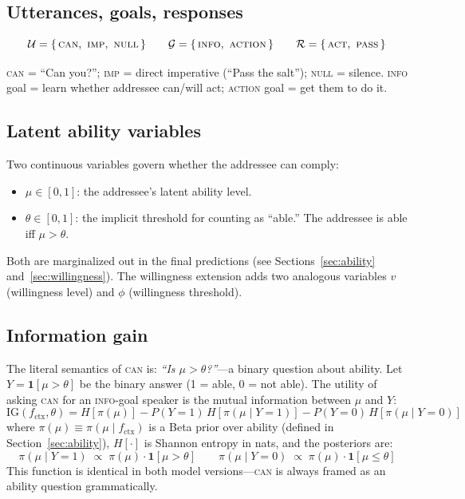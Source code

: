 \documentclass[11pt]{article}
\begin{document}
\subsection{Utterances, goals, responses}

\[
  \mathcal{U} = \{\,\textsc{can},\ \textsc{imp},\ \textsc{null}\,\}
  \qquad
  \mathcal{G} = \{\,\textsc{info},\ \textsc{action}\,\}
  \qquad
  \mathcal{R} = \{\,\textsc{act},\ \textsc{pass}\,\}
\]

\textsc{can} = ``Can you?''; \textsc{imp} = direct imperative (``Pass the salt'');
\textsc{null} = silence. \textsc{info} goal = learn whether addressee can/will act;
\textsc{action} goal = get them to do it.

\subsection{Latent ability variables}

Two continuous variables govern whether the addressee can comply:
\begin{itemize}
  \item $\mu \in [0,1]$: the addressee's latent ability level.
  \item $\theta \in [0,1]$: the implicit threshold for counting as ``able.'' The addressee is able iff $\mu > \theta$.
\end{itemize}

Both are marginalized out in the final predictions (see Sections~\ref{sec:ability} and~\ref{sec:willingness}).
The willingness extension adds two analogous variables $v$ (willingness level) and $\phi$ (willingness threshold).

\subsection{Information gain}

The literal semantics of \textsc{can} is: \emph{``Is $\mu > \theta$?''}---a
binary question about ability. Let $Y = \mathbf{1}[\mu > \theta]$ be the binary
answer (1 = able, 0 = not able). The utility of asking \textsc{can} for an
\textsc{info}-goal speaker is the mutual information between $\mu$ and $Y$:
\[
  \mathrm{IG}(f_{\text{ctx}}, \theta)
  = H\!\left[\pi(\mu)\right]
  - P(Y{=}1)\, H\!\left[\pi(\mu \mid Y{=}1)\right]
  - P(Y{=}0)\, H\!\left[\pi(\mu \mid Y{=}0)\right]
\]
where $\pi(\mu) \equiv \pi(\mu \mid f_{\text{ctx}})$ is a Beta prior over ability
(defined in Section~\ref{sec:ability}), $H[\cdot]$ is Shannon entropy in nats,
and the posteriors are:
\[
  \pi(\mu \mid Y{=}1) \;\propto\; \pi(\mu)\cdot\mathbf{1}[\mu > \theta]
  \qquad
  \pi(\mu \mid Y{=}0) \;\propto\; \pi(\mu)\cdot\mathbf{1}[\mu \leq \theta]
\]
This function is identical in both model versions---\textsc{can} is always
framed as an ability question grammatically.
\end{document}
